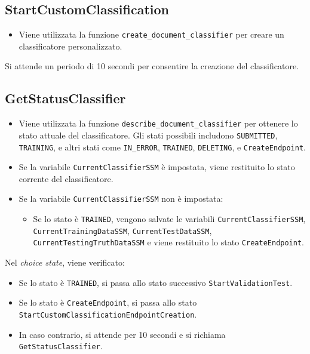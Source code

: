 \subsection{StartCustomClassification}
\begin{itemize}
  \item Viene utilizzata la funzione \texttt{create\_document\_classifier} per creare un classificatore personalizzato.
\end{itemize}
Si attende un periodo di 10 secondi per consentire la creazione del classificatore.

\subsection{GetStatusClassifier}
\begin{itemize}
  \item Viene utilizzata la funzione \texttt{describe\_document\_classifier} per ottenere lo stato attuale del classificatore. Gli stati possibili includono \texttt{SUBMITTED}, \texttt{TRAINING}, e altri stati come \texttt{IN\_ERROR}, \texttt{TRAINED}, \texttt{DELETING}, e \texttt{CreateEndpoint}.
  \item Se la variabile \texttt{CurrentClassifierSSM} è impostata, viene restituito lo stato corrente del classificatore.
  \item Se la variabile \texttt{CurrentClassifierSSM} non è impostata:
  \begin{itemize}
    \item Se lo stato è \texttt{TRAINED}, vengono salvate le variabili \texttt{CurrentClassifierSSM}, \texttt{CurrentTrainingDataSSM}, \texttt{CurrentTestDataSSM}, \texttt{CurrentTestingTruthDataSSM} e viene restituito lo stato \texttt{CreateEndpoint}.
  \end{itemize}
\end{itemize}
Nel \textit{choice state}, viene verificato:
\begin{itemize}
  \item Se lo stato è \texttt{TRAINED}, si passa allo stato successivo \texttt{StartValidationTest}.
  \item Se lo stato è \texttt{CreateEndpoint}, si passa allo stato \texttt{StartCustomClassificationEndpointCreation}.
  \item In caso contrario, si attende per 10 secondi e si richiama \texttt{GetStatusClassifier}.
\end{itemize}

